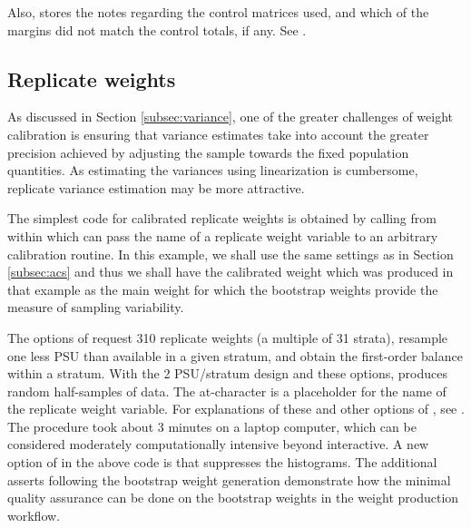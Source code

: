 Also,  stores the notes regarding the control matrices
used, and which of the margins did not match the control totals, if any.
See .

\subsection{Replicate weights}

As discussed in Section \ref{subsec:variance}, one of the greater challenges
of weight calibration is ensuring that variance estimates take into account
the greater precision achieved by adjusting the sample towards the fixed
population quantities. As estimating the variances using linearization
is cumbersome, replicate variance estimation may be more attractive.

\begin{stexample}[Example 6]

The simplest code for calibrated replicate weights is obtained by calling
 from within  \citep{kolenikov:2010}
which can pass the name of a replicate weight variable to an arbitrary
calibration routine. In this example, we shall use the same settings
as in Section \ref{subsec:acs} and thus we shall have the calibrated weight
 which was produced in that example as the main weight
for which the bootstrap weights provide the measure of sampling variability.

\begin{stlog}
\nullskip
\end{stlog}

The options of  request 310 replicate weights
(a multiple of 31 strata), resample one less PSU than available in
a given stratum, and obtain the first-order balance within a stratum.
With the 2 PSU/stratum design and these options, 
produces random half-samples of data. The at-character  is a placeholder
for the name of the replicate weight variable.
For explanations of these and other options of ,
see \citet{kolenikov:2010}. The procedure took about 3 minutes
on a laptop computer, which can be considered moderately
computationally intensive beyond interactive.
A new option of  in the above code is
 that suppresses the histograms.
The additional asserts \citep{gould:2003:tip3} following the bootstrap
weight generation demonstrate how the minimal quality assurance
can be done on the bootstrap weights in the weight production workflow.



\end{stexample}
